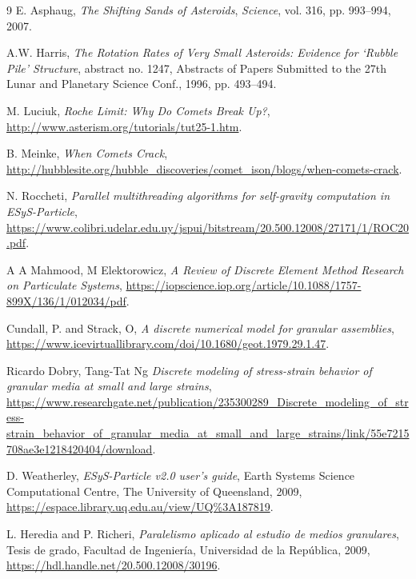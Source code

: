 \documentclass[a4paper,11pt]{book}
\begin{document}
\begin{thebibliography}{9}
	 E. Asphaug, \textit{The Shifting Sands of Asteroids}, \textit{Science}, vol. 316, pp. 993--994, 2007.

	 A.W. Harris, \textit{The Rotation Rates of Very Small Asteroids: Evidence for ‘Rubble Pile’ Structure}, abstract no. 1247, Abstracts of Papers Submitted to the 27th Lunar and Planetary Science Conf., 1996, pp. 493–494.

	 M. Luciuk, \textit{Roche Limit: Why Do Comets Break Up?}, \url{http://www.asterism.org/tutorials/tut25-1.htm}.

	 B. Meinke, \textit{When Comets Crack}, \url{http://hubblesite.org/hubble_discoveries/comet_ison/blogs/when-comets-crack}.

	 N. Roccheti, \textit{Parallel multithreading algorithms for self-gravity computation in ESyS-Particle}, \url{https://www.colibri.udelar.edu.uy/jspui/bitstream/20.500.12008/27171/1/ROC20.pdf}.

	 A A Mahmood, M Elektorowicz, \textit{A Review of Discrete Element Method Research on Particulate Systems}, \url{https://iopscience.iop.org/article/10.1088/1757-899X/136/1/012034/pdf}.

	 Cundall, P. and Strack, O, \textit{A discrete numerical model for granular
		assemblies}, \url{https://www.icevirtuallibrary.com/doi/10.1680/geot.1979.29.1.47}.

	 Ricardo Dobry, Tang-Tat Ng \textit{Discrete modeling of stress-strain behavior of granular media at small and large strains}, \url{https://www.researchgate.net/publication/235300289_Discrete_modeling_of_stress-strain_behavior_of_granular_media_at_small_and_large_strains/link/55e7215708ae3e1218420404/download}.

     D. Weatherley, \textit{ESyS-Particle v2.0 user's guide}, Earth Systems Science Computational Centre, The University of Queensland, 2009, \url{https://espace.library.uq.edu.au/view/UQ%3A187819}.

     L. Heredia and P. Richeri, \textit{Paralelismo aplicado al estudio de medios granulares}, Tesis de grado, Facultad de Ingeniería, Universidad de la República, 2009, \url{https://hdl.handle.net/20.500.12008/30196}.

\end{thebibliography}
\end{document}
